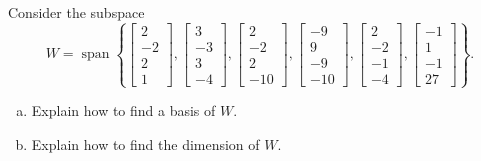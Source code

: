
\begin{exerciseStatement}


Consider the subspace \[W=\operatorname{span}  \left\{ \left[\begin{array}{c}
2 \\
-2 \\
2 \\
1
\end{array}\right] , \left[\begin{array}{c}
3 \\
-3 \\
3 \\
-4
\end{array}\right] , \left[\begin{array}{c}
2 \\
-2 \\
2 \\
-10
\end{array}\right] , \left[\begin{array}{c}
-9 \\
9 \\
-9 \\
-10
\end{array}\right] , \left[\begin{array}{c}
2 \\
-2 \\
-1 \\
-4
\end{array}\right] , \left[\begin{array}{c}
-1 \\
1 \\
-1 \\
27
\end{array}\right] \right\} .\]


\begin{enumerate}[(a)]
\item  Explain how to find a basis of \(W\).
\item  Explain how to find the dimension of \(W\).
\end{enumerate}
    
\end{exerciseStatement}
    
